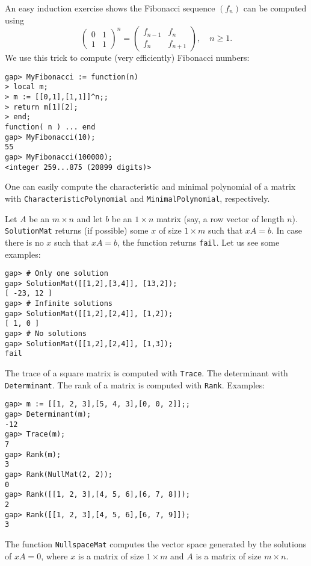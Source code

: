 \begin{example}
An easy induction exercise shows the Fibonacci sequence $(f_n)$ 
can be computed using 
\[
    \begin{pmatrix}
        0 & 1\\
        1 & 1
    \end{pmatrix}^n=\begin{pmatrix}
        f_{n-1} & f_n\\
        f_n & f_{n+1}
    \end{pmatrix},\quad n\geq1. 
\]
We use this trick to compute (very efficiently) Fibonacci numbers: 
\begin{lstlisting}
gap> MyFibonacci := function(n)
> local m;
> m := [[0,1],[1,1]]^n;;
> return m[1][2];
> end;
function( n ) ... end
gap> MyFibonacci(10);
55
gap> MyFibonacci(100000);
<integer 259...875 (20899 digits)>
\end{lstlisting}
\end{example}

One can easily compute the characteristic and minimal polynomial of a matrix
with \lstinline{CharacteristicPolynomial} and \lstinline{MinimalPolynomial},
respectively.

Let $A$ be an $m\times n$ and let $b$ be an $1\times n$ matrix (say, a row
vector of length $n$).  \lstinline{SolutionMat} returns (if possible) some $x$
of size $1\times m$ such that $xA=b$. In case there is no $x$ such that $xA=b$,
the function returns  \lstinline{fail}. Let us see some examples:
\begin{lstlisting}
gap> # Only one solution
gap> SolutionMat([[1,2],[3,4]], [13,2]);
[ -23, 12 ]
gap> # Infinite solutions
gap> SolutionMat([[1,2],[2,4]], [1,2]);
[ 1, 0 ]
gap> # No solutions
gap> SolutionMat([[1,2],[2,4]], [1,3]);
fail
\end{lstlisting}

The trace of a square matrix is computed with \lstinline{Trace}. The
determinant with \lstinline{Determinant}. The rank of a matrix is computed with
\lstinline{Rank}. Examples:
\begin{lstlisting}
gap> m := [[1, 2, 3],[5, 4, 3],[0, 0, 2]];;
gap> Determinant(m);
-12
gap> Trace(m);
7
gap> Rank(m);
3
gap> Rank(NullMat(2, 2));
0
gap> Rank([[1, 2, 3],[4, 5, 6],[6, 7, 8]]);
2
gap> Rank([[1, 2, 3],[4, 5, 6],[6, 7, 9]]);
3
\end{lstlisting}
The function \lstinline{NullspaceMat} computes the vector space generated by
the solutions of $xA=0$, where $x$ is a matrix of size $1\times m$ and $A$ is a
matrix of size $m\times n$.

